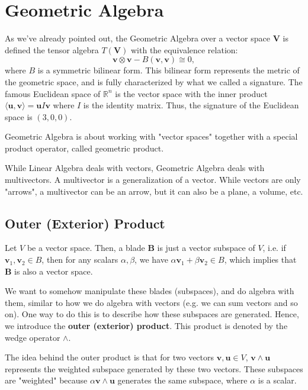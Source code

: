 \section{Geometric Algebra}

As we've already pointed out, the Geometric Algebra
over a vector space $\mathbf V$ is defined the tensor
algebra $T(\mathbf V)$ with the equivalence relation:
\begin{displaymath}
	\mathbf{v} \otimes \mathbf{v} - B(\mathbf v, \mathbf v) \cong 0,
\end{displaymath}
where $B$ is a symmetric bilinear form.
This bilinear form represents the metric of the geometric space,
and is fully characterized by what we called a signature.
The famous Euclidean space of $\mathbb R^n$ is the vector
space with the inner product
$\langle \mathbf u, \mathbf v \rangle = \mathbf u I \mathbf v$
where $I$ is the identity matrix.
Thus, the signature of the Euclidean space is $(3,0,0)$.

Geometric Algebra is about working with "vector spaces" together with a special
product operator, called geometric product.

While Linear Algebra deals with vectors, Geometric Algebra deals with multivectors.
A multivector is a generalization of a vector. While vectors are only "arrows", a multivector
can be an arrow, but it can also be a plane, a volume, etc.

\subsection{Outer (Exterior) Product}

Let $V$ be a vector space. Then, a blade $\mathbf B$ is just a vector subspace of $V$, i.e. 
if $\mathbf v_1, \mathbf v_2 \in B$, then for any scalars $\alpha, \beta$,
we have $\alpha \mathbf v_1 + \beta \mathbf v_2 \in B$, which implies that
$\mathbf B$ is also a vector space.

We want to somehow manipulate these blades (subspaces), and do algebra with them,
similar to how we do algebra with vectors (e.g. we can sum vectors
and so on). One way to do this is to describe how these subspaces are generated.
Hence, we introduce the \textbf{outer (exterior) product}.
This product is denoted by the wedge operator $\wedge$.

The idea behind the outer product is that for two vectors $\mathbf v, \mathbf u \in V$, $\mathbf v \wedge \mathbf u$ represents the weighted subspace generated
by these two vectors. These subspaces are "weighted" because $\alpha \mathbf v \wedge \mathbf u$ generates the same subspace, where
$\alpha$ is a scalar.

